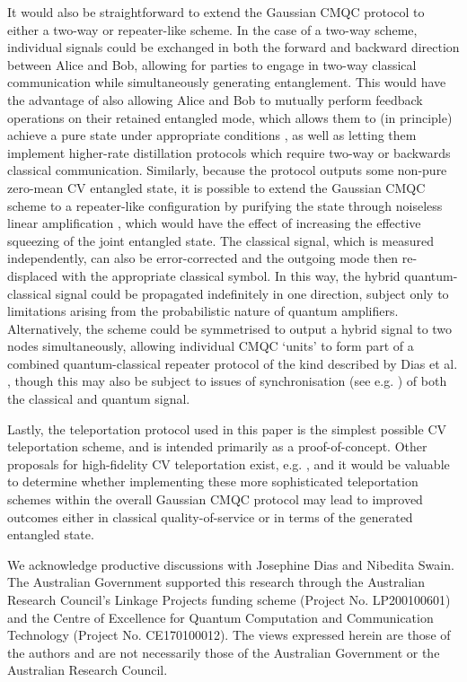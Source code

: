 \documentclass[%
 reprint,
 superscriptaddress,
 amsmath,
 amssymb,
 aps,
 pra,
]{revtex4-2}
\begin{document}
It would also be straightforward to extend the Gaussian CMQC protocol to either a two-way or repeater-like scheme. In the case of a two-way scheme, individual signals could be exchanged in both the forward and backward direction between Alice and Bob, allowing for parties to engage in two-way classical communication while simultaneously generating entanglement. This would have the advantage of also allowing Alice and Bob to mutually perform feedback operations on their retained entangled mode, which allows them to (in principle) achieve a pure state under appropriate conditions \cite{braunstein_quantum_2005}, as well as letting them implement higher-rate distillation protocols which require two-way or backwards classical communication. Similarly, because the protocol outputs some non-pure zero-mean CV entangled state, it is possible to extend the Gaussian CMQC scheme to a repeater-like configuration by purifying the state through noiseless linear amplification \cite{ralph_nondeterministic_2009, xiang_heralded_2010}, which would have the effect of increasing the effective squeezing of the joint entangled state. The classical signal, which is measured independently, can also be error-corrected and the outgoing mode then re-displaced with the appropriate classical symbol. In this way, the hybrid quantum-classical signal could be propagated indefinitely in one direction, subject only to limitations arising from the probabilistic nature of quantum amplifiers. Alternatively, the scheme could be symmetrised to output a hybrid signal to two nodes simultaneously, allowing individual CMQC `units' to form part of a combined quantum-classical repeater protocol of the kind described by Dias et al. \cite{dias_distributing_2022}, though this may also be subject to issues of synchronisation (see e.g. \cite{rohde_quantum_2025}) of both the classical and quantum signal.

Lastly, the teleportation protocol \cite{braunstein_quantum_2005} used in this paper is the simplest possible CV teleportation scheme, and is intended primarily as a proof-of-concept. Other proposals for high-fidelity CV teleportation exist, e.g. \cite{andersen_high-fidelity_2013}, and it would be valuable to determine whether implementing these more sophisticated teleportation schemes within the overall Gaussian CMQC protocol may lead to improved outcomes either in classical quality-of-service or in terms of the generated entangled state.

\begin{acknowledgments}
We acknowledge productive discussions with Josephine Dias and Nibedita Swain. The Australian Government supported this research through the Australian Research Council’s Linkage Projects funding scheme (Project No. LP200100601) and the Centre of Excellence for Quantum Computation and Communication Technology (Project No. CE170100012). The views expressed herein are those of the authors and are not necessarily those of the Australian Government or the Australian Research Council.
\end{acknowledgments}
\end{document}
